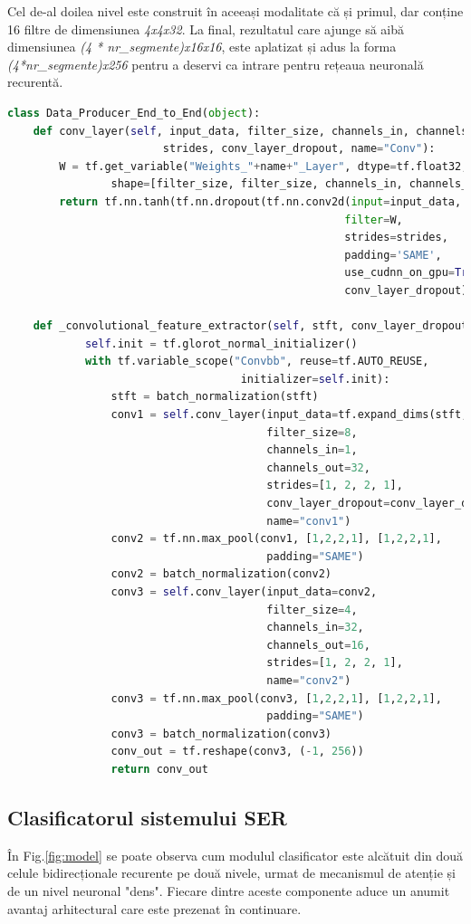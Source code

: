 \documentclass[a4paper,12pt]{book}
\begin{document}
				Cel de-al doilea nivel este construit în aceeași modalitate că și primul, dar conține 16 filtre de dimensiunea \textit{4x4x32}. La final, rezultatul care ajunge să aibă dimensiunea \textit{(4 * nr\_segmente)x16x16}, este aplatizat și adus la forma \textit{(4*nr\_segmente)x256} pentru a deservi ca intrare pentru rețeaua neuronală recurentă. 
				\begin{lstlisting}[language=Python, caption={Implementarea nivelelor convoluționale care realizează extragerea caracteristicilor în manieră end-to-end folosind procedurile librăriei Tensorflow.}, xleftmargin=-1cm, label=cnn_code]
class Data_Producer_End_to_End(object):
	def conv_layer(self, input_data, filter_size, channels_in, channels_out, 
						strides, conv_layer_dropout, name="Conv"):
		W = tf.get_variable("Weights_"+name+"_Layer", dtype=tf.float32, 
				shape=[filter_size, filter_size, channels_in, channels_out])
		return tf.nn.tanh(tf.nn.dropout(tf.nn.conv2d(input=input_data, 
													filter=W, 
													strides=strides, 
													padding='SAME', 
													use_cudnn_on_gpu=True), 
													conv_layer_dropout))
					
	def _convolutional_feature_extractor(self, stft, conv_layer_dropout):
			self.init = tf.glorot_normal_initializer()
			with tf.variable_scope("Convbb", reuse=tf.AUTO_REUSE, 
									initializer=self.init):
				stft = batch_normalization(stft)
				conv1 = self.conv_layer(input_data=tf.expand_dims(stft,axis=3),
										filter_size=8, 
										channels_in=1, 
										channels_out=32, 
										strides=[1, 2, 2, 1], 
										conv_layer_dropout=conv_layer_dropout, 
										name="conv1")			
				conv2 = tf.nn.max_pool(conv1, [1,2,2,1], [1,2,2,1], 
										padding="SAME")
				conv2 = batch_normalization(conv2)
				conv3 = self.conv_layer(input_data=conv2, 
										filter_size=4, 
										channels_in=32,
										channels_out=16, 
										strides=[1, 2, 2, 1], 										conv_layer_dropout=conv_layer_dropout, 
										name="conv2")				
				conv3 = tf.nn.max_pool(conv3, [1,2,2,1], [1,2,2,1], 
										padding="SAME")
				conv3 = batch_normalization(conv3)
				conv_out = tf.reshape(conv3, (-1, 256))
				return conv_out	\end{lstlisting}		
			
			\subsection{Clasificatorul sistemului SER} \label{clasif_prac}
				În Fig.\ref{fig:model} se poate observa cum modulul clasificator este alcătuit din două celule bidirecționale recurente pe două nivele, urmat de mecanismul de atenție și de un nivel neuronal "dens". Fiecare dintre aceste componente aduce un anumit avantaj arhitectural care este prezenat în continuare. \par 
				
\end{document}

